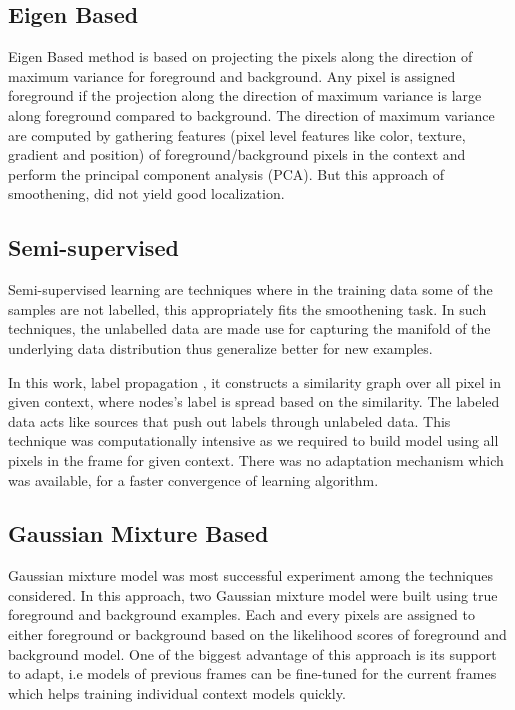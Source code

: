 \subsection{Eigen Based}
Eigen Based method is based on projecting the pixels along the direction of maximum variance for foreground and background.  Any pixel is assigned foreground if the projection along the direction of maximum variance is large along foreground compared to background.  The direction of maximum variance are computed by gathering features (pixel level features like color, texture, gradient and position) of foreground/background pixels in the context and perform the principal component analysis (PCA).  But this approach of smoothening, did not yield good localization.

\subsection{Semi-supervised}
Semi-supervised learning are techniques where in the training data some of the samples are not labelled, this appropriately fits the smoothening task.  In such techniques, the unlabelled data are made use for capturing the manifold of the underlying data distribution thus generalize better for new examples. 
\par In this work, label propagation \citep{labprop}, it constructs a similarity graph over all pixel in given context, where nodes's label is spread based on the similarity.   The labeled data acts like sources that push out labels through unlabeled data.  This technique was computationally intensive as we required to build model using all pixels in the frame for given context.  There was no adaptation mechanism which was available, for a faster convergence of learning algorithm.

\subsection{Gaussian Mixture Based}
Gaussian mixture model was  most successful experiment among the techniques considered.  In this approach, two Gaussian mixture model were built using true foreground and background examples. Each and every pixels are assigned to either foreground or background based on the likelihood scores of foreground and background model.  One of the biggest advantage of this approach is its support to adapt, i.e models of previous frames can be fine-tuned for the current frames which helps training individual context models quickly.

